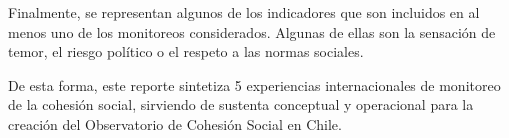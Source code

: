 \documentclass[
  12pt,
]{book}
\begin{document}
Finalmente, se representan algunos de los indicadores que son incluidos
en al menos uno de los monitoreos considerados. Algunas de ellas son la
sensación de temor, el riesgo político o el respeto a las normas
sociales.

De esta forma, este reporte sintetiza 5 experiencias internacionales de
monitoreo de la cohesión social, sirviendo de sustenta conceptual y
operacional para la creación del Observatorio de Cohesión Social en
Chile.

  
\end{document}
